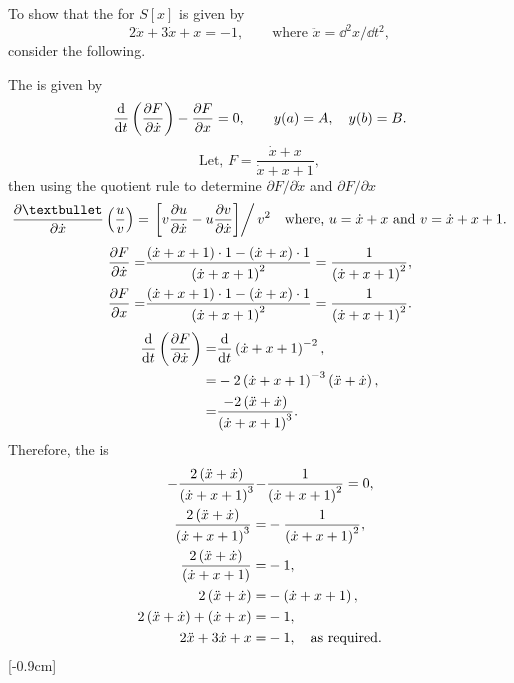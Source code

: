 To show that the \el for $S[x]$ is given by
\[
	2\ddot{x} + 3\dot{x} + x = -1,\qquad\textrm{where } \ddot{x} = \dd^2x/\dd t^2,
\]
consider the following.

The \el is given by%
\[
	\ELEd{F}{t}{x},\qquad y(a)=A,\quad y(b)=B.
\]
\[
	\textrm{Let, } F = \frac{\dot{x} + x}{\dot{x} + x + 1},
\]
then using the quotient rule to determine $\partial F/\partial\dot{x}$ and $\partial F/\partial x$
\begin{align*}
		\pderiv{•}{\dot{x}}\lr{\frac{u}{v}} = \left.\lrs{v\pderiv{u}{\dot{x}} - u\pderiv{v}{\dot{x}}}\right/v^2\quad\textrm{where, }u=\dot{x} + x\textrm{ and } v=\dot{x} + x + 1.
\end{align*}
\begin{align*}
	\pderiv{F}{\dot{x}} =& \frac{\lr{\dot{x} + x + 1}\cdot 1 - \lr{\dot{x} + x}\cdot 1}{\lr{\dot{x} + x + 1}^2} = \frac{1}{\lr{\dot{x} + x + 1}^2},\\
	\pderiv{F}{x} =& \frac{\lr{\dot{x} + x + 1}\cdot 1 - \lr{\dot{x} + x}\cdot 1}{\lr{\dot{x} + x + 1}^2} = \frac{1}{\lr{\dot{x} + x + 1}^2}.
\end{align*}
\begin{align*}
	\deriv{}{t}\lr{\pderiv{F}{\dot{x}}} =& \deriv{}{t}\lr{\dot{x} + x + 1}^{-2},\\
	=& -2\lr{\dot{x} + x + 1}^{-3}\lr{\ddot{x}+\dot{x}},\\
	=& \frac{-2\lr{\ddot{x}+\dot{x}}}{\lr{\dot{x} + x + 1}^{3}}.
\end{align*}
Therefore, the \el is
\begin{align}
	-\frac{2\lr{\ddot{x}+\dot{x}}}{\lr{\dot{x} + x + 1}^{3}} -& \frac{1}{\lr{\dot{x} + x + 1}^{2}} = 0,\nonumber\\
	\frac{2\lr{\ddot{x}+\dot{x}}}{\lr{\dot{x} + x + 1}^{3}} =& -\frac{1}{\lr{\dot{x} + x + 1}^{2}},\nonumber\\
	\frac{2\lr{\ddot{x}+\dot{x}}}{\lr{\dot{x} + x + 1}} =& -1,\nonumber\\
	2\lr{\ddot{x}+\dot{x}} =& -\lr{\dot{x} + x + 1},\nonumber\\
	2\lr{\ddot{x}+\dot{x}} + \lr{\dot{x} + x} =& -1,\nonumber\\
	\label{6.2}
	2\ddot{x} + 3\dot{x} + x =&-1,\quad\textrm{as required.}
\end{align}
[-0.9cm]%
